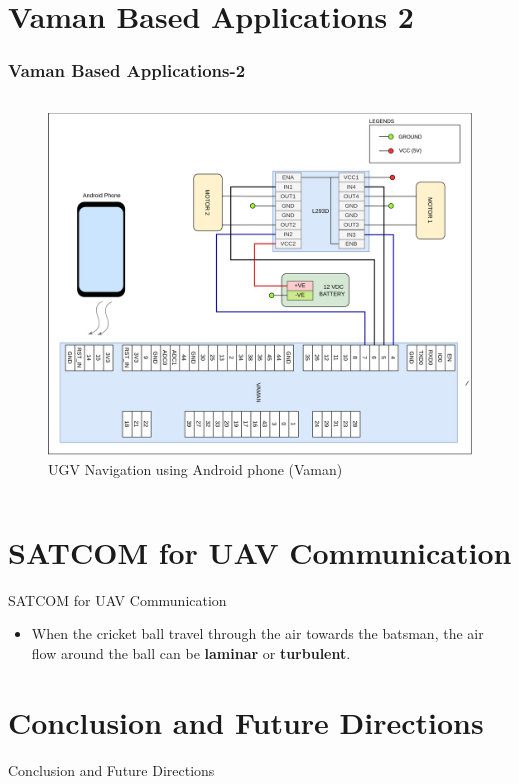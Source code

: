 \documentclass{beamer}
\begin{document}
\section{Vaman Based Applications 2}
\begin{frame}
\frametitle{Vaman Based Applications-2}
\begin{columns}
	\begin{figure}[h!]
  		\centering
  		\includegraphics[width=\linewidth]{./figs/Wiring_UGV_phone_vaman.png}
  		\caption{UGV Navigation using Android phone (Vaman)}
  		\label{Wiring_UGV_phone_vaman}
	\end{figure}
\end{columns}
\end{frame}

\section{SATCOM for UAV Communication}
\begin{frame}{SATCOM for UAV Communication}
    \begin{itemize}
    \item 
    When the cricket ball travel through the air towards the batsman, the air flow around the ball can be \textbf{laminar} or \textbf{turbulent}.
  \end{itemize}
\end{frame} 

\section{Conclusion and Future Directions}
\begin{frame}{Conclusion and Future Directions}
    
  
\end{frame} 
\end{document}
